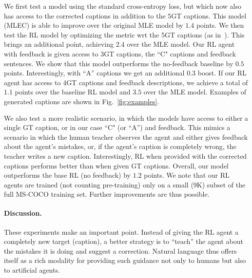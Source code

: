 
We first test a model using the standard cross-entropy loss, but which now also has access to the corrected captions in addition to the 5GT captions.  This model (MLEC) is able to improve over the original MLE model by $1.4$ points. We then test the RL model by optimizing the metric wrt the 5GT captions (as in~\cite{Selfcritical}). This brings an additional point, achieving $2.4$ over the MLE model. Our RL agent with feedback is given access to 3GT captions, the ``C" captions and feedback sentences. We show that this model outperforms the no-feedback baseline by $0.5$ points. Interestingly, with ``A'' captions we get an additional $0.3$ boost. If our RL agent has access to 4GT captions and feedback descriptions, we achieve a total of $1.1$ points over the baseline RL model and $3.5$ over the MLE model. Examples of generated captions are shown in Fig.~\ref{fig:examples}.

We also test a more realistic scenario, in which the models have access to either a single GT caption, or in our case ``C" (or ``A'') and feedback. This mimics a scenario in which the human teacher observes the agent and either gives feedback about the agent's mistakes, or, if the agent's caption is completely wrong, the teacher writes a new caption. 
Interestingly, RL when provided with the corrected captions performs better than when given GT captions. Overall, our model outperforms the base RL (no feedback) by $1.2$ points. We note that our RL agents are trained (not counting pre-training) only on a small (9K) subset of the full MS-COCO training set. Further improvements are thus possible. 

\vspace{-3mm}
\paragraph{Discussion.} These experiments make an important point. Instead of giving the RL agent a completely new target (caption), a better strategy  is to ``teach'' the agent about the mistakes it is doing and suggest a correction. Natural language thus offers itself as a rich modality for providing such guidance not only to humans but also to artificial agents. 


